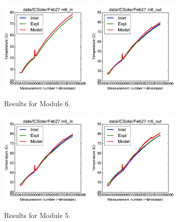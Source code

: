\documentclass{article}
\begin{document}
\begin{figure}[!ht]
\centering
\includegraphics[width=0.4\textwidth]{../../data/ICSolar/images/Feb27_m6_in_unsteady.pdf}\hspace{0.05\textwidth}
\includegraphics[width=0.4\textwidth]{../../data/ICSolar/images/Feb27_m6_out_unsteady.pdf}\hspace{0.05\textwidth}\\
\caption{Results for Module 6.}\end{figure}
\begin{figure}[!ht]
\centering
\includegraphics[width=0.4\textwidth]{../../data/ICSolar/images/Feb27_m5_in_unsteady.pdf}\hspace{0.05\textwidth}
\includegraphics[width=0.4\textwidth]{../../data/ICSolar/images/Feb27_m5_out_unsteady.pdf}\hspace{0.05\textwidth}\\
\caption{Results for Module 5.}\end{figure}
\end{document}
